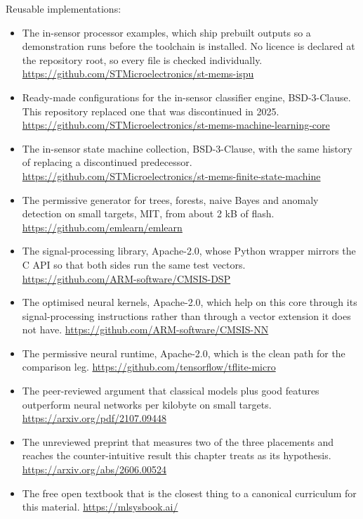 Reusable implementations:
\begin{itemize}
\item The in-sensor processor examples, which ship prebuilt outputs so a
demonstration runs before the toolchain is installed. No licence is declared at
the repository root, so every file is checked individually.\newline
\url{https://github.com/STMicroelectronics/st-mems-ispu}
\item Ready-made configurations for the in-sensor classifier engine,
BSD-3-Clause. This repository replaced one that was discontinued in 2025.\newline
\url{https://github.com/STMicroelectronics/st-mems-machine-learning-core}
\item The in-sensor state machine collection, BSD-3-Clause, with the same
history of replacing a discontinued predecessor.\newline
\url{https://github.com/STMicroelectronics/st-mems-finite-state-machine}
\item The permissive generator for trees, forests, naive Bayes and anomaly
detection on small targets, MIT, from about 2 kB of flash.\newline
\url{https://github.com/emlearn/emlearn}
\item The signal-processing library, Apache-2.0, whose Python wrapper mirrors the
C API so that both sides run the same test vectors.\newline
\url{https://github.com/ARM-software/CMSIS-DSP}
\item The optimised neural kernels, Apache-2.0, which help on this core through
its signal-processing instructions rather than through a vector extension it
does not have.\newline
\url{https://github.com/ARM-software/CMSIS-NN}
\item The permissive neural runtime, Apache-2.0, which is the clean path for the
comparison leg.\newline
\url{https://github.com/tensorflow/tflite-micro}
\item The peer-reviewed argument that classical models plus good features
outperform neural networks per kilobyte on small targets.\newline
\url{https://arxiv.org/pdf/2107.09448}
\item The unreviewed preprint that measures two of the three placements and
reaches the counter-intuitive result this chapter treats as its hypothesis.\newline
\url{https://arxiv.org/abs/2606.00524}
\item The free open textbook that is the closest thing to a canonical curriculum
for this material.\newline
\url{https://mlsysbook.ai/}
\end{itemize}
